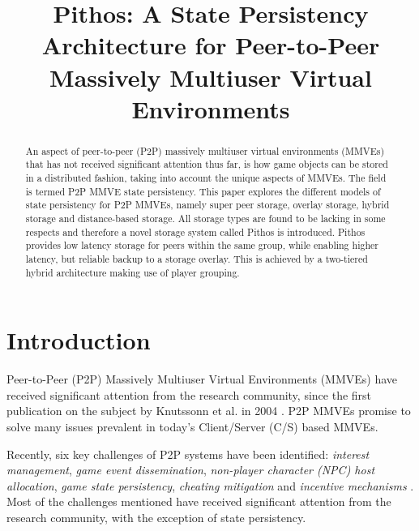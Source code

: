 \documentclass[10pt,a4paper,conference]{IEEEtran}
\begin{document}
%
\title{Pithos: A State Persistency Architecture for Peer-to-Peer Massively Multiuser Virtual Environments}


\maketitle

\begin{abstract}
An aspect of peer-to-peer (P2P) massively multiuser virtual environments (MMVEs) that has not received significant attention thus far, is how game
objects can be stored in a distributed fashion, taking into account the unique aspects of MMVEs. The field is termed P2P MMVE state persistency. This
paper explores the different models of state persistency for P2P MMVEs, namely super peer storage, overlay storage, hybrid storage and distance-based
storage. All storage types are found to be lacking in some respects and therefore a novel storage system called Pithos is introduced. Pithos provides
low latency storage for peers within the same group, while enabling higher latency, but reliable backup to a storage overlay. This is achieved by a
two-tiered hybrid architecture making use of player grouping.
\end{abstract}


\section{Introduction}
\label{introduction}

Peer-to-Peer (P2P) Massively Multiuser Virtual Environments (MMVEs) have received significant attention from the research community, since the first
publication on the subject by Knutssonn et al. in 2004 \cite{knutsson_p2p_first}. P2P MMVEs promise to solve many issues prevalent in today's
Client/Server (C/S) based MMVEs.

Recently, six key challenges of P2P systems have been identified: \emph{interest management}, \emph{game event dissemination}, \emph{non-player
character (NPC) host allocation}, \emph{game state persistency}, \emph{cheating mitigation} and \emph{incentive mechanisms}
\cite{Fan_deisgn_issues_p2p}. Most of the challenges mentioned have received significant attention from the research community, with the exception of
state persistency.
\end{document}
